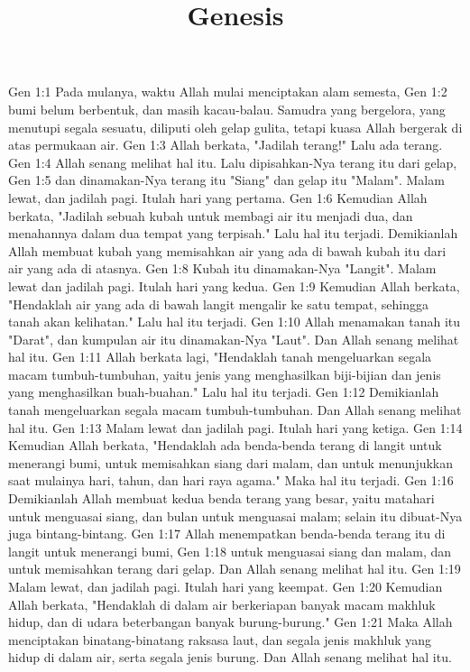 

\title{Genesis}

Gen 1:1  Pada mulanya, waktu Allah mulai menciptakan alam semesta,
Gen 1:2  bumi belum berbentuk, dan masih kacau-balau. Samudra yang bergelora, yang menutupi segala sesuatu, diliputi oleh gelap gulita, tetapi kuasa Allah bergerak di atas permukaan air.
Gen 1:3  Allah berkata, "Jadilah terang!" Lalu ada terang.
Gen 1:4  Allah senang melihat hal itu. Lalu dipisahkan-Nya terang itu dari gelap,
Gen 1:5  dan dinamakan-Nya terang itu "Siang" dan gelap itu "Malam". Malam lewat, dan jadilah pagi. Itulah hari yang pertama.
Gen 1:6  Kemudian Allah berkata, "Jadilah sebuah kubah untuk membagi air itu menjadi dua, dan menahannya dalam dua tempat yang terpisah." Lalu hal itu terjadi. Demikianlah Allah membuat kubah yang memisahkan air yang ada di bawah kubah itu dari air yang ada di atasnya.
Gen 1:8  Kubah itu dinamakan-Nya "Langit". Malam lewat dan jadilah pagi. Itulah hari yang kedua.
Gen 1:9  Kemudian Allah berkata, "Hendaklah air yang ada di bawah langit mengalir ke satu tempat, sehingga tanah akan kelihatan." Lalu hal itu terjadi.
Gen 1:10  Allah menamakan tanah itu "Darat", dan kumpulan air itu dinamakan-Nya "Laut". Dan Allah senang melihat hal itu.
Gen 1:11  Allah berkata lagi, "Hendaklah tanah mengeluarkan segala macam tumbuh-tumbuhan, yaitu jenis yang menghasilkan biji-bijian dan jenis yang menghasilkan buah-buahan." Lalu hal itu terjadi.
Gen 1:12  Demikianlah tanah mengeluarkan segala macam tumbuh-tumbuhan. Dan Allah senang melihat hal itu.
Gen 1:13  Malam lewat dan jadilah pagi. Itulah hari yang ketiga.
Gen 1:14  Kemudian Allah berkata, "Hendaklah ada benda-benda terang di langit untuk menerangi bumi, untuk memisahkan siang dari malam, dan untuk menunjukkan saat mulainya hari, tahun, dan hari raya agama." Maka hal itu terjadi.
Gen 1:16  Demikianlah Allah membuat kedua benda terang yang besar, yaitu matahari untuk menguasai siang, dan bulan untuk menguasai malam; selain itu dibuat-Nya juga bintang-bintang.
Gen 1:17  Allah menempatkan benda-benda terang itu di langit untuk menerangi bumi,
Gen 1:18  untuk menguasai siang dan malam, dan untuk memisahkan terang dari gelap. Dan Allah senang melihat hal itu.
Gen 1:19  Malam lewat, dan jadilah pagi. Itulah hari yang keempat.
Gen 1:20  Kemudian Allah berkata, "Hendaklah di dalam air berkeriapan banyak macam makhluk hidup, dan di udara beterbangan banyak burung-burung."
Gen 1:21  Maka Allah menciptakan binatang-binatang raksasa laut, dan segala jenis makhluk yang hidup di dalam air, serta segala jenis burung. Dan Allah senang melihat hal itu.
